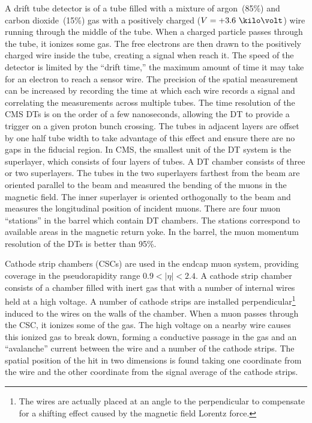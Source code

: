 A drift tube detector is of a tube filled with a mixture of argon~(85\%) and
carbon dioxide~(15\%) gas with a positively charged ($V = +3.6~\kilo\volt$) wire
running through the middle of the tube.  When a charged particle passes through
the tube, it ionizes some gas.  The free electrons are then drawn to the
positively charged wire inside the tube, creating a signal when reach it. The
speed of the detector is limited by the ``drift time,'' the maximum amount of
time it may take for an electron to reach a sensor wire.   The precision of the
spatial measurement can be increased by recording the time at which each wire
records a signal and correlating the measurements across multiple tubes. The
time resolution of the CMS DTs is on the order of a few nanoseconds, allowing
the DT to provide a trigger on a given proton bunch crossing.  The tubes in
adjacent layers are offset by one half tube width to take advantage of this
effect and ensure there are no gaps in the fiducial region.  In CMS, the
smallest unit of the DT system is the superlayer, which consists of four layers
of tubes.  A DT chamber consists of three or two superlayers.  The tubes in the
two superlayers farthest from the beam are oriented parallel to the beam and
measured the bending of the muons in the magnetic field.  The inner superlayer
is oriented orthogonally to the beam and measures the longitudinal position of
incident muons.  There are four muon ``stations'' in the barrel which contain DT
chambers.  The stations correspond to available areas in the magnetic return
yoke.  In the barrel, the muon momentum resolution of the DTs is better than
95\%.

Cathode strip chambers (CSCs) are used in the endcap muon system, providing
coverage in the pseudorapidity range $0.9 < |\eta| < 2.4$.  A cathode strip
chamber consists of a chamber filled with inert gas that with a number of
internal wires held at a high voltage.   A number of cathode strips are
installed perpendicular\footnote{The wires are actually placed at an angle to
the perpendicular to compensate for a shifting effect caused by the magnetic
field Lorentz force.} induced to the wires on the walls of the chamber.  When a
muon passes through the CSC, it ionizes some of the gas.  The high
voltage on a nearby wire causes this ionized gas to break down, forming a
conductive passage in the gas and an ``avalanche'' current between the wire and
a number of the cathode strips.  The spatial position of the hit in two
dimensions is found taking one coordinate from the wire and the other coordinate
from the signal average of the cathode strips.

